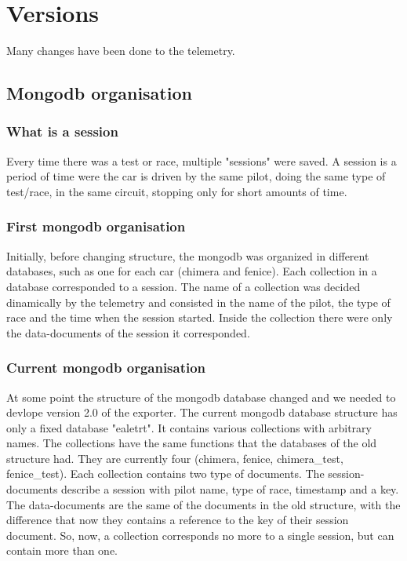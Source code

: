 \section{\huge{Versions}}
Many changes have been done to the telemetry.

\subsection{Mongodb organisation}

\subsubsection{What is a session}
Every time there was a test or race, multiple "sessions" were saved. A session is a period of time were the car is driven by the same pilot,
doing the same type of test/race, in the same circuit, stopping only for short amounts of time.

\subsubsection{First mongodb organisation}
Initially, before changing structure, the mongodb was organized in different databases, such as one for each car (chimera and fenice). 
Each collection in a database corresponded to a session. The name of a collection was decided dinamically by the telemetry and consisted
in the name of the pilot, the type of race and the time when the session started. Inside the collection there were only the data-documents
of the session it corresponded. 

\subsubsection{Current mongodb organisation}
At some point the structure of the mongodb database changed and we needed to devlope version 2.0 of the exporter. The current mongodb database
structure has only a fixed database "ealetrt". It contains various collections with arbitrary names. The collections have the same functions
that the databases of the old structure had. They are currently four (chimera, fenice, chimera\_test, fenice\_test). Each collection contains 
two type of documents. The session-documents describe a session with pilot name, type of race, timestamp and a key. The data-documents are the
same of the documents in the old structure, with the difference that now they contains a reference to the key of their session document. So,
now, a collection corresponds no more to a single session, but can contain more than one.

